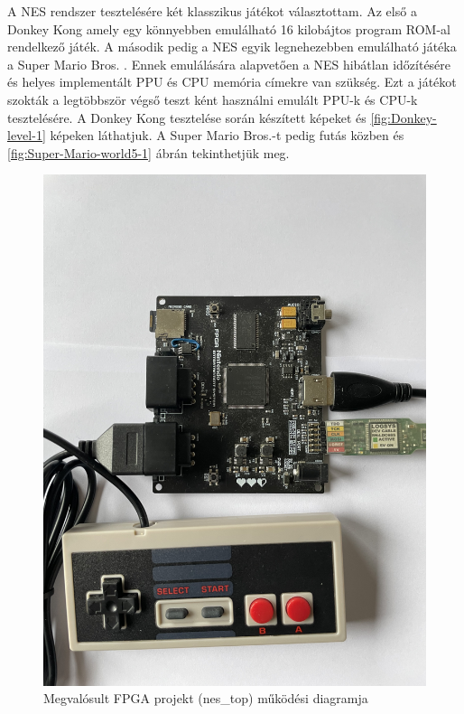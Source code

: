 A NES rendszer tesztelésére két klasszikus játékot választottam. Az első a Donkey Kong amely egy könnyebben emulálható 16 kilobájtos program ROM-al rendelkező játék. A második pedig a NES egyik legnehezebben emulálható játéka a Super Mario Bros. . Ennek emulálására alapvetően a NES hibátlan időzítésére és helyes implementált PPU és CPU memória címekre van szükség. Ezt a játékot szokták a legtöbbször végső teszt ként használni emulált PPU-k és CPU-k tesztelésére. A Donkey Kong tesztelése során készített képeket  és \ref{fig:Donkey-level-1} képeken láthatjuk. A Super Mario Bros.-t pedig futás közben  és \ref{fig:Super-Mario-world5-1} ábrán tekinthetjük meg.
	
\begin{figure}[H]
	\centering
	\includegraphics[width=150mm, keepaspectratio]{figures/nes-pcb-testing}
	\caption{Megvalósult FPGA projekt (nes\_top) működési diagramja} 
	\label{fig:pcb-testing}
\end{figure}

